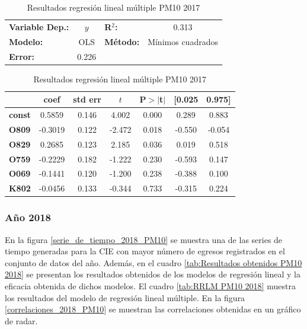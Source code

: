 \begin{table}[hbt!]
\caption{Resultados regresión lineal múltiple PM10 2017}
\label{tab:RRLM PM10 2017}
\begin{center}
\begin{tabular}{lclc}
\toprule
\textbf{Variable Dep.:}    &        $y$         & \textbf{  R$^2$:         } &     0.313   \\
\textbf{Modelo:}            &       OLS        & \textbf{Método:}           &  Mínimos cuadrados  \\
\textbf{Error:}            & 0.226  \\
\bottomrule
\end{tabular}
\begin{tabular}{lcccccc}
               & \textbf{coef} & \textbf{std err} & \textbf{$t$} & \textbf{P$> |$t$|$} & \textbf{[0.025} & \textbf{0.975]}  \\
\midrule
\textbf{const} &       0.5859  &        0.146     &     4.002  &         0.000        &        0.289    &        0.883     \\
\textbf{O809}  &      -0.3019  &        0.122     &    -2.472  &         0.018        &       -0.550    &       -0.054     \\
\textbf{O829}  &       0.2685  &        0.123     &     2.185  &         0.036        &        0.019    &        0.518     \\
\textbf{O759}  &      -0.2229  &        0.182     &    -1.222  &         0.230        &       -0.593    &        0.147     \\
\textbf{O069}  &      -0.1441  &        0.120     &    -1.200  &         0.238        &       -0.388    &        0.100     \\
\textbf{K802}  &      -0.0456  &        0.133     &    -0.344  &         0.733        &       -0.315    &        0.224     \\
\bottomrule
\end{tabular}
\end{center}
\end{table}

\clearpage
\subsubsection{Año 2018}
En la figura \ref{serie_de_tiempo_2018_PM10} se muestra una de las series de tiempo generadas para la CIE con mayor número de egresos registrados en el conjunto de datos del año. Además, en el cuadro \ref{tab:Resultados obtenidos PM10 2018} se presentan los resultados obtenidos de los modelos de regresión lineal y la eficacia obtenida de dichos modelos. El cuadro \ref{tab:RRLM PM10 2018} muestra los resultados del modelo de regresión lineal múltiple. En la figura \ref{correlaciones_2018_PM10} se muestran las correlaciones obtenidas en un gráfico de radar.

